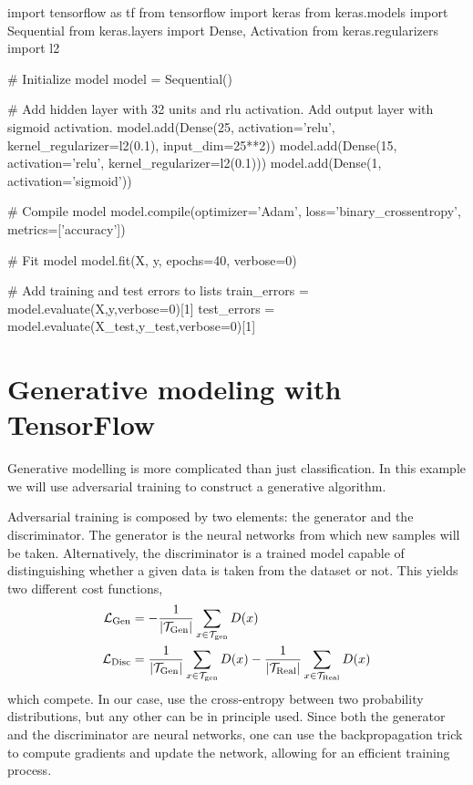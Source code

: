 \documentclass[]{report}
\begin{document}
\begin{boxedverbatim}
import tensorflow as tf
from tensorflow import keras
from keras.models import Sequential
from keras.layers import Dense, Activation
from keras.regularizers import l2

# Initialize model
model = Sequential()

# Add hidden layer with 32 units and rlu activation. Add output layer with sigmoid activation.
model.add(Dense(25, activation='relu', kernel_regularizer=l2(0.1), input_dim=25**2))
model.add(Dense(15, activation='relu', kernel_regularizer=l2(0.1)))
model.add(Dense(1, activation='sigmoid'))

# Compile model
model.compile(optimizer='Adam', loss='binary_crossentropy', metrics=['accuracy'])

# Fit model
model.fit(X, y, epochs=40, verbose=0)

# Add training and test errors to lists
train_errors = model.evaluate(X,y,verbose=0)[1]
test_errors = model.evaluate(X_test,y_test,verbose=0)[1] 
\end{boxedverbatim}
\vskip5mm

\section{Generative modeling with TensorFlow}\label{sec.generative-tensorflow}

Generative modelling is more complicated than just classification. In this example we will use adversarial training to construct a generative algorithm. 

Adversarial training is composed by two elements: the generator and the discriminator. The generator is the neural networks from which new samples will be taken. Alternatively, the discriminator is a trained model capable of distinguishing whether a given data is taken from the dataset or not. This yields two different cost functions,
\begin{align}
\mathcal L_{\rm Gen} & = -\frac{1}{\vert \mathcal T_{\rm Gen} \vert}\sum_{x \in \mathcal T_{\rm gen}} D(x)\\
\mathcal L_{\rm Disc} & = \frac{1}{\vert \mathcal T_{\rm Gen} \vert}\sum_{x \in \mathcal T_{\rm gen}} D(x) - \frac{1}{\vert \mathcal T_{\rm Real} \vert}\sum_{x \in \mathcal T_{\rm Real}} D(x)
\end{align}
which compete. In our case, use the cross-entropy between two probability distributions, but any other can be in principle used. Since both the generator and the discriminator are neural networks, one can use the backpropagation trick to compute gradients and update the network, allowing for an efficient training process. 
\end{document}
